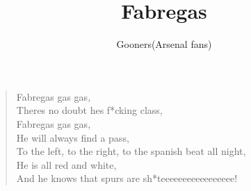 \documentclass[a4paper,12pt]{article}
\title{Fabregas}
\author{Gooners(Arsenal fans)}
\date{}
\begin{document}
	
	\maketitle
	
	\begin{verse}
		
		Fabregas gas gas, \\
		Theres no doubt hes f*cking class, \\
		Fabregas gas gas, \\
		He will always find a pass, \\
		To the left, to the right, to the spanish beat all night, \\
		He is all red and white, \\
		And he knows that spurs are sh*teeeeeeeeeeeeeeeee!
		
	\end{verse}
	
\end{document}

